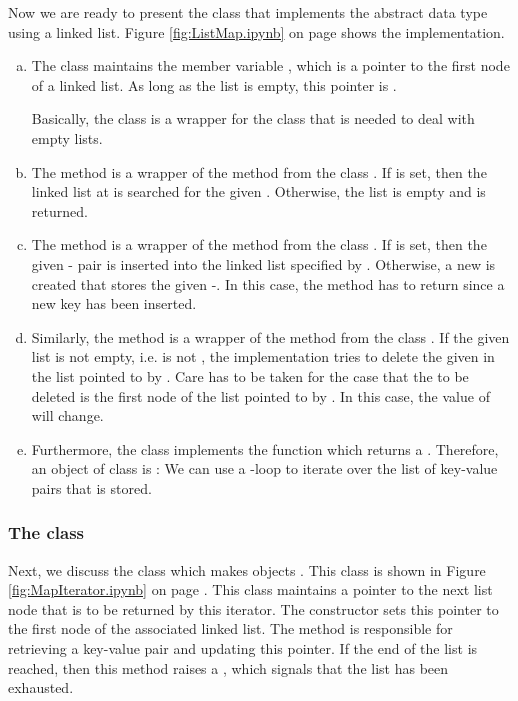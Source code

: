 Now we are ready to present the class  that implements the abstract data type  using a
linked list.  Figure \ref{fig:ListMap.ipynb} on page \pageref{fig:ListMap.ipynb} shows the implementation.
\begin{enumerate}[(a)]
\item The class maintains the  member variable , which is a pointer to the first node of a linked
      list.  As long as the list is empty, this pointer is .

      Basically, the class  is a wrapper for the class  that is needed to deal
      with empty lists.
\item The method  is a wrapper of the method  from the class .
      If  is set, then the linked list at  is searched for the given .
      Otherwise, the list is empty and  is returned.
\item The method  is a wrapper of the method  from the class .
      If  is set, then the given - pair is inserted into the
      linked list specified by .
      Otherwise, a new  is created that stores the given  -.
      In this case, the method has to return  since a new key has been inserted.
\item Similarly, the method  is a wrapper of the method  from the class
      .  If the given list is not empty, i.e.  is not ,
      the implementation tries to delete the given  in the list pointed to by .
      Care has to be taken for the case that the  to be deleted is the first node of the
      list pointed to by .  In this case, the value of  will change.
\item Furthermore, the class implements the function  which returns a
      .  Therefore, an object of class  is : We can
      use a -loop to iterate over the list of key-value pairs that is stored.  
\end{enumerate}
    
\subsubsection{The class }
Next, we discuss the class  which makes  objects .
This class is shown in Figure \ref{fig:MapIterator.ipynb} on page \pageref{fig:MapIterator.ipynb}.
This class maintains a pointer to the next list node that is to be returned by this iterator.
The constructor sets this pointer to the first node of the associated linked list.
The method  is responsible for retrieving a key-value pair and updating this pointer.
If the end of the list is reached, then this method raises a , which signals that the
list has been exhausted.

